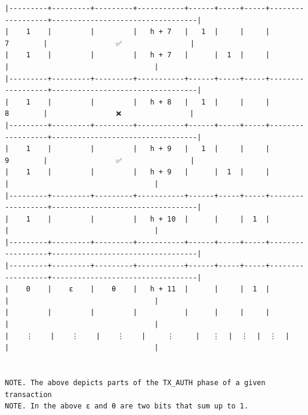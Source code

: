 \documentclass[varwidth=\maxdimen,margin=0.5cm,multi={verbatim}]{standalone}
\begin{document}
\begin{verbatim}
|---------+---------+---------+-----------+------+-----+-----+------------------+----------------------------------|
|    1    |         |         |   h + 7   |   1  |     |     |         7        |                ✅                |
|    1    |         |         |   h + 7   |      |  1  |     |                  |                                  |
|---------+---------+---------+-----------+------+-----+-----+------------------+----------------------------------|
|    1    |         |         |   h + 8   |   1  |     |     |         8        |                ❌                |
|---------+---------+---------+-----------+------+-----+-----+------------------+----------------------------------|
|    1    |         |         |   h + 9   |   1  |     |     |         9        |                ✅                |
|    1    |         |         |   h + 9   |      |  1  |     |                  |                                  |
|---------+---------+---------+-----------+------+-----+-----+------------------+----------------------------------|
|    1    |         |         |   h + 10  |      |     |  1  |                  |                                  |
|---------+---------+---------+-----------+------+-----+-----+------------------+----------------------------------|
|---------+---------+---------+-----------+------+-----+-----+------------------+----------------------------------|
|    0    |    ε    |    θ    |   h + 11  |      |     |  1  |                  |                                  |
|         |         |         |           |      |     |     |                  |                                  |
|    ⋮    |    ⋮    |    ⋮    |     ⋮     |   ⋮  |  ⋮  |  ⋮  |                  |                                  |


NOTE. The above depicts parts of the TX_AUTH phase of a given transaction
NOTE. In the above ε and θ are two bits that sum up to 1.

\end{verbatim}
\end{document}
